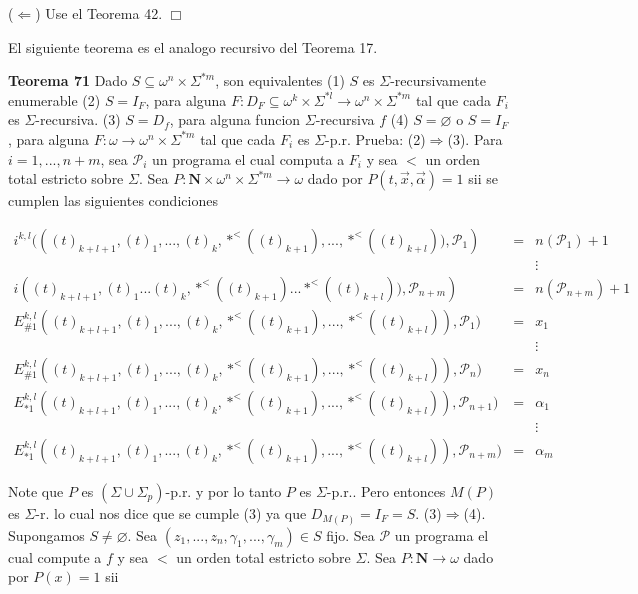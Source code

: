 (\(\Leftarrow \)) Use el Teorema 42. \(\Box\)

El siguiente teorema es el analogo recursivo del Teorema 17.




\textbf{Teorema 71} Dado \(S\subseteq \omega ^{n}\times \Sigma ^{\ast m} \), son equivalentes
(1) \(S\) es \(\Sigma \)-recursivamente enumerable
(2) \(S=I_{F}\), para alguna \(F:D_{F}\subseteq \omega ^{k}\times \Sigma ^{\ast l}\rightarrow \omega ^{n}\times \Sigma ^{\ast m}\) tal que cada \(F_{i}\) es \(\Sigma \)-recursiva.
(3) \(S=D_{f}\), para alguna funcion \(\Sigma \)-recursiva \(f\)
(4) \(S=\varnothing \) o \(S=I_{F}\), para alguna \(F:\omega \rightarrow \omega ^{n}\times \Sigma ^{\ast m}\) tal que cada \(F_{i}\) es \(\Sigma \)-p.r.
Prueba: (2)\(\Rightarrow \)(3). Para \(i=1,...,n+m\), sea \(\mathcal{P}_{i}\) un programa el cual computa a \(F_{i}\) y sea \(< \) un orden total estricto sobre \(\Sigma \). Sea \(P:\mathbf{N}\times \omega ^{n}\times \Sigma ^{\ast m}\rightarrow \omega \) dado por \(P(t,\vec{x},\vec{\alpha})=1\) sii se cumplen las siguientes condiciones

\(\displaystyle \begin{array}{rcl} i^{k,l}(\left( (t)_{k+l+1},(t)_{1},...,(t)_{k},\ast ^{< }((t)_{k+1}),...,\ast ^{< }((t)_{k+l})),\mathcal{P}_{1}\right) & =& n(\mathcal{P}_{1})+1 \\ & & \vdots \\ i\left( (t)_{k+l+1},(t)_{1}...(t)_{k},\ast ^{< }((t)_{k+1})...\ast ^{< }((t)_{k+l})),\mathcal{P}_{n+m}\right) & =& n(\mathcal{P}_{n+m})+1 \\ E_{\#1}^{k,l}((t)_{k+l+1},(t)_{1},...,(t)_{k},\ast ^{< }((t)_{k+1}),...,\ast ^{< }((t)_{k+l})),\mathcal{P}_{1}) & =& x_{1} \\ & & \vdots \\ E_{\#1}^{k,l}((t)_{k+l+1},(t)_{1},...,(t)_{k},\ast ^{< }((t)_{k+1}),...,\ast ^{< }((t)_{k+l})),\mathcal{P}_{n}) & =& x_{n} \\ E_{\ast 1}^{k,l}((t)_{k+l+1},(t)_{1},...,(t)_{k},\ast ^{< }((t)_{k+1}),...,\ast ^{< }((t)_{k+l})),\mathcal{P}_{n+1}) & =& \alpha _{1} \\ & & \vdots \\ E_{\ast 1}^{k,l}((t)_{k+l+1},(t)_{1},...,(t)_{k},\ast ^{< }((t)_{k+1}),...,\ast ^{< }((t)_{k+l})),\mathcal{P}_{n+m}) & =& \alpha _{m} \end{array} \)

Note que \(P\) es \((\Sigma \cup \Sigma _{p})\)-p.r. y por lo tanto \(P\) es \( \Sigma \)-p.r.. Pero entonces \(M(P)\) es \(\Sigma \)-r. lo cual nos dice que se cumple (3) ya que \(D_{M(P)}=I_{F}=S\).
(3)\(\Rightarrow \)(4). Supongamos \(S\neq \varnothing \). Sea \( (z_{1},...,z_{n},\gamma _{1},...,\gamma _{m})\in S\) fijo. Sea \(\mathcal{P}\) un programa el cual compute a \(f\) y sea \(< \) un orden total estricto sobre \( \Sigma \). Sea \(P:\mathbf{N}\rightarrow \omega \) dado por \(P(x)=1\) sii

